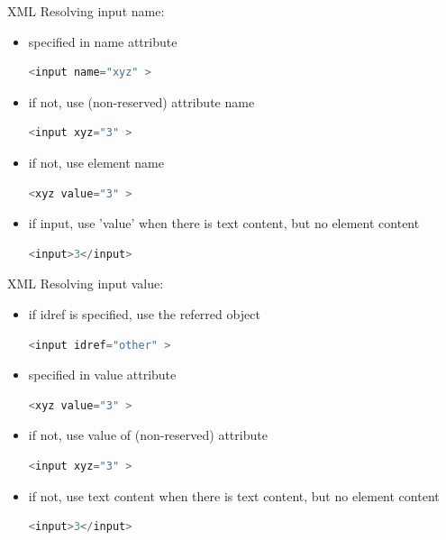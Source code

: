 \documentclass{beamer}
\theoremstyle{definition}
\begin{document}
\begin{frame}[containsverbatim]
{\Large XML}
Resolving input name:
\begin{itemize}
\item specified in name attribute
\begin{lstlisting}[language=java]
    <input name="xyz" >
\end{lstlisting}
\item if not, use (non-reserved) attribute name
\begin{lstlisting}[language=java]
    <input xyz="3" >
\end{lstlisting}
\item if not, use element name
\begin{lstlisting}[language=java]
    <xyz value="3" >
\end{lstlisting}
\item if input, use 'value' when there is text content, but no element content
\begin{lstlisting}[language=java]
    <input>3</input>
\end{lstlisting}
\end{itemize}
\end{frame}


\begin{frame}[containsverbatim]
{\Large XML}
Resolving input value:
\begin{itemize}
\item if idref is specified, use the referred object
\begin{lstlisting}[language=java]
    <input idref="other" >
\end{lstlisting}
\item specified in value attribute
\begin{lstlisting}[language=java]
    <xyz value="3" >
\end{lstlisting}
\item if not, use value of (non-reserved) attribute
\begin{lstlisting}[language=java]
    <input xyz="3" >
\end{lstlisting}
\item if not, use text content when there is text content, but no element content
\begin{lstlisting}[language=java]
    <input>3</input>
\end{lstlisting}
\end{itemize}
\end{frame}
\end{document}
